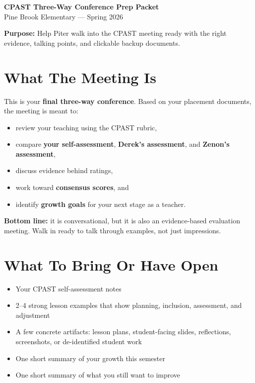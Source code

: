 \documentclass[11pt]{article}
\begin{document}
\begin{center}
{\LARGE\bfseries CPAST Three-Way Conference Prep Packet}\\[0.4em]
{\large Pine Brook Elementary --- Spring 2026}\\[0.3em]
\colorbox{cpastsoft}{\parbox{0.92\linewidth}{\centering
\textbf{Purpose:} Help Piter walk into the CPAST meeting ready with the right evidence, talking points, and clickable backup documents.
}}
\end{center}

\section{What The Meeting Is}

This is your \textbf{final three-way conference}. Based on your placement documents, the meeting is meant to:
\begin{itemize}[leftmargin=*]
  \item review your teaching using the CPAST rubric,
  \item compare \textbf{your self-assessment}, \textbf{Derek's assessment}, and \textbf{Zenon's assessment},
  \item discuss evidence behind ratings,
  \item work toward \textbf{consensus scores}, and
  \item identify \textbf{growth goals} for your next stage as a teacher.
\end{itemize}

\textbf{Bottom line:} it is conversational, but it is also an evidence-based evaluation meeting. Walk in ready to talk through examples, not just impressions.

\section{What To Bring Or Have Open}

\begin{itemize}[leftmargin=*]
  \item Your CPAST self-assessment notes
  \item 2--4 strong lesson examples that show planning, inclusion, assessment, and adjustment
  \item A few concrete artifacts: lesson plans, student-facing slides, reflections, screenshots, or de-identified student work
  \item One short summary of your growth this semester
  \item One short summary of what you still want to improve
\end{itemize}
\end{document}
